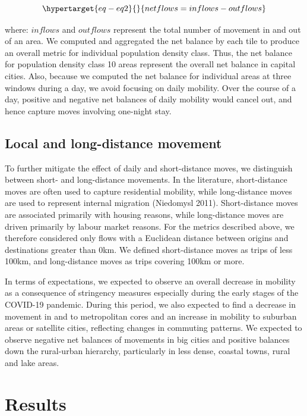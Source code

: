\documentclass[
  11pt,
]{article}
\begin{document}
\begin{equation}\protect\hypertarget{eq-eq2}{}{
netflows = inflows - outflows
}\label{eq-eq2}\end{equation}

where: \(inflows\) and \(outflows\) represent the total number of
movement in and out of an area. We computed and aggregated the net
balance by each tile to produce an overall metric for individual
population density class. Thus, the net balance for population density
class 10 areas represent the overall net balance in capital cities.
Also, because we computed the net balance for individual areas at three
windows during a day, we avoid focusing on daily mobility. Over the
course of a day, positive and negative net balances of daily mobility
would cancel out, and hence capture moves involving one-night stay.

\hypertarget{local-and-long-distance-movement}{%
\subsection{Local and long-distance
movement}\label{local-and-long-distance-movement}}

To further mitigate the effect of daily and short-distance moves, we
distinguish between short- and long-distance movements. In the
literature, short-distance moves are often used to capture residential
mobility, while long-distance moves are used to represent internal
migration (Niedomysl 2011). Short-distance moves are associated
primarily with housing reasons, while long-distance moves are driven
primarily by labour market reasons. For the metrics described above, we
therefore considered only flows with a Euclidean distance between
origins and destinations greater than 0km. We defined short-distance
moves as trips of less 100km, and long-distance moves as trips covering
100km or more.

In terms of expectations, we expected to observe an overall decrease in
mobility as a consequence of stringency measures especially during the
early stages of the COVID-19 pandemic. During this period, we also
expected to find a decrease in movement in and to metropolitan cores and
an increase in mobility to suburban areas or satellite cities,
reflecting changes in commuting patterns. We expected to observe
negative net balances of movements in big cities and positive balances
down the rural-urban hierarchy, particularly in less dense, coastal
towns, rural and lake areas.

\hypertarget{sec-results}{%
\section{Results}\label{sec-results}}
\end{document}
